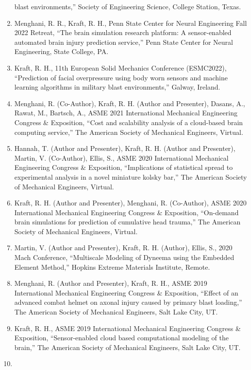 \documentclass[11pt]{article}
\begin{document}
\begin{enumerate}
  blast environments,'' Society of Engineering Science, College Station,
  Texas.
\item
  Menghani, R. 
R., Kraft, R. 
H., Penn State Center for Neural
  Engineering Fall 2022 Retreat, ``The brain simulation research
  platform: A sensor-enabled automated brain injury prediction service,''
  Penn State Center for Neural Engineering, State College, PA.
\item
  Kraft, R. 
H., 11th European Solid Mechanics Conference (ESMC2022),
  ``Prediction of facial overpressure using body worn sensors and machine
  learning algorithms in military blast environments,'' Galway, Ireland.
\item
  Menghani, R. 
(Co-Author), Kraft, R. 
H. 
(Author and Presenter), Dasans,
  A., Rawat, M., Bartsch, A., ASME 2021 International Mechanical
  Engineering Congress \& Exposition, ``Cost and scalability analysis of
  a cloud-based brain computing service,'' The American Society of
  Mechanical Engineers, Virtual.
\item
  Hannah, T. 
(Author and Presenter), Kraft, R. 
H. 
(Author and
  Presenter), Martin, V. 
(Co-Author), Ellis, S., ASME 2020 International
  Mechanical Engineering Congress \& Exposition, ``Implications of
  statistical spread to experimental analysis in a novel miniature
  kolsky bar,'' The American Society of Mechanical Engineers, Virtual.
\item
  Kraft, R. 
H. 
(Author and Presenter), Menghani, R. 
(Co-Author), ASME
  2020 International Mechanical Engineering Congress \& Exposition,
  ``On-demand brain simulations for prediction of cumulative head
  trauma,'' The American Society of Mechanical Engineers, Virtual.
\item
  Martin, V. 
(Author and Presenter), Kraft, R. 
H. 
(Author), Ellis, S.,
  2020 Mach Conference, ``Multiscale Modeling of Dyneema using the
  Embedded Element Method,'' Hopkins Extreme Materials Institute, Remote.
\item
  Menghani, R. 
(Author and Presenter), Kraft, R. 
H., ASME 2019
  International Mechanical Engineering Congress \& Exposition, ``Effect
  of an advanced combat helmet on axonal injury caused by primary blast
  loading,'' The American Society of Mechanical Engineers, Salt Lake
  City, UT.
\item
  Kraft, R. 
H., ASME 2019 International Mechanical Engineering Congress
  \& Exposition, ``Sensor-enabled cloud based computational modeling of
  the brain,'' The American Society of Mechanical Engineers, Salt Lake
  City, UT.
\item

\end{enumerate}
\end{document}
